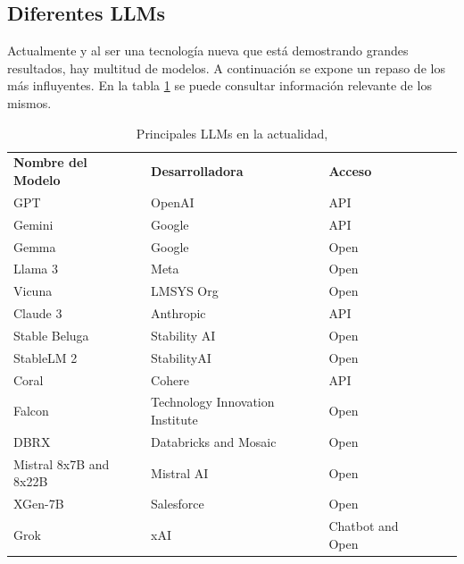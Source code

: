 \subsection{Diferentes LLMs}

Actualmente y al ser una tecnología nueva que está demostrando grandes resultados, hay multitud de modelos. A continuación se expone un repaso de los más influyentes. En la tabla \ref{tab:tablellm} se puede consultar información relevante de los mismos.

\begin{table}[]
\begin{tabular}{lllll}
\textbf{Nombre del Modelo}     & \textbf{Desarrolladora}                & \textbf{Acceso}           &  &  \\
GPT                     & OpenAI                          & API              &  &  \\
Gemini                  & Google                          & API              &  &  \\
Gemma                   & Google                          & Open             &  &  \\
Llama 3                 & Meta                            & Open             &  &  \\
Vicuna                  & LMSYS Org                       & Open             &  &  \\
Claude 3                & Anthropic                       & API              &  &  \\
Stable Beluga           & Stability AI                    & Open             &  &  \\
StableLM 2              & StabilityAI                     & Open             &  &  \\
Coral                   & Cohere                          & API              &  &  \\
Falcon                  & Technology Innovation Institute & Open             &  &  \\
DBRX                    & Databricks and Mosaic           & Open             &  &  \\
Mistral 8x7B and  8x22B & Mistral AI                      & Open             &  &  \\
XGen-7B                 & Salesforce                      & Open             &  &  \\
Grok                    & xAI                             & Chatbot and Open &  & 
\end{tabular}
\caption{Principales LLMs en la actualidad, \cite{harry_guinness_best_2024}}
\label{tab:tablellm}
\end{table}

